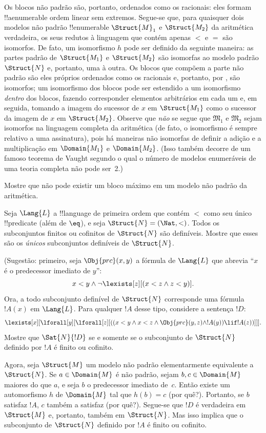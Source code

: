 \documentclass[../../../include/open-logic-section]{subfiles}
\begin{document}
Os blocos não padrão são, portanto, ordenados como os racionais: eles
formam !!a{enumerable} ordem linear sem extremos. Segue-se
que, para quaisquer dois modelos não padrão !!{enumerable} $\Struct{M}_1$ e
$\Struct{M_2}$ da aritmética verdadeira, os seus redutos à linguagem
que contém apenas $<$ e $=$ são isomorfos. De fato, um isomorfismo $h$
pode ser definido da seguinte maneira: as partes padrão de $\Struct{M_1}$ e
$\Struct{M_2}$ são isomorfas ao modelo padrão $\Struct{N}$ e,
portanto, uma à outra. Os blocos que compõem a parte não padrão são
eles próprios ordenados como os racionais e, portanto, por
, são isomorfos; um isomorfismo dos blocos
pode ser estendido a um isomorfismo \emph{dentro} dos blocos, fazendo corresponder
elementos arbitrários em cada um e, em seguida, tomando a imagem do
sucessor de $x$ em $\Struct{M_1}$ como o sucessor da imagem de
$x$ em $\Struct{M_2}$. Observe que \emph{não} se segue que
$\mathfrak{M}_1$ e $\mathfrak{M}_2$ sejam isomorfos na linguagem completa
da aritmética (de fato, o isomorfismo é sempre relativo a uma
assinatura), pois há maneiras não isomorfas de definir a adição e a
multiplicação em $\Domain{M_1}$ e $\Domain{M_2}$. (Isso também
decorre de um famoso teorema de Vaught segundo o qual o número de
modelos enumeráveis de uma teoria completa não pode ser~2.)

\begin{prob}
Mostre que não pode existir um bloco máximo em um modelo não padrão da
aritmética.
\end{prob}

\begin{prob} 
Seja $\Lang{L}$ a !!{language} de primeira ordem que contém $<$ como seu
único !!{predicate} (além de $\eq$), e seja $\Struct{N} = (\Nat,
<)$. Todos os subconjuntos finitos ou cofinitos de $\Struct{N}$ são
definíveis. Mostre que esses são os \emph{únicos} subconjuntos definíveis de
$\Struct{N}$.
 
(Sugestão: primeiro, seja $\Obj{prc}(x,y)$ a
fórmula de $\Lang{L}$ que abrevia ``$x$ é o predecessor imediato
de $y$'':
\[
x<y \land \lnot \lexists[z][(x<z \land z < y)].
\]
Ora, a todo subconjunto definível de $\Struct{N}$ corresponde uma
fórmula $!A(x)$ em $\Lang{L}$. Para qualquer $!A$ desse tipo,
considere a sentença $!D$:
\[
\lexists[x][\lforall[y][\lforall[z][((x<y \land x<z \land \Obj{prc}(y,z)
  \land !A(y)) \lif !A(z))]]].
\]
Mostre que $\Sat{N}{!D}$ se e somente se o subconjunto de
$\Struct{N}$ definido por $!A$ é finito ou cofinito.

Agora, seja $\Struct{M}$ um modelo não padrão elementarmente
equivalente a $\Struct{N}$. Se $a \in \Domain{M}$ é
não padrão, sejam $b, c \in \Domain{M}$ maiores do que $a$, e
seja $b$ o predecessor imediato de~$c$. Então existe um
automorfismo $h$ de $\Domain{M}$ tal que $h(b)=c$
(por quê?). Portanto, se $b$ satisfaz $!A$, $c$ também a satisfaz (por quê?).
Segue-se que $!D$ é verdadeira em $\Struct{M}$ e, portanto, também em
$\Struct{N}$. Mas isso implica que o subconjunto de $\Struct{N}$
definido por $!A$ é finito ou cofinito.
\end{prob}
\end{document}
